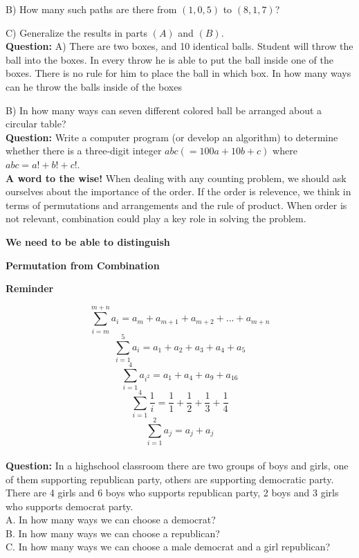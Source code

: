 \documentclass[11pt]{article}
\begin{document}
B) How many such paths are there from $(1,0,5)$ to $(8,1,7)$?

C) Generalize the results in parts $(A)$ and $(B)$.
\\

\textbf{Question:} A) There are two boxes, and 10 identical balls. Student will throw the 
ball into the boxes. In every throw he is able to put the ball inside one of the boxes. There 
is no rule for him to place the ball in which box. In how many ways can he throw the balls 
inside of the boxes %

B) In how many ways can seven different colored ball be arranged about a circular table? 
\\ %

\textbf{Question:}  Write a computer program (or develop an algorithm) to determine whether there is a three-digit integer $abc (= 100a + 10b + c)$ where $abc = a! + b! + c!$.
\\ %

\textbf{A word to the wise!} When dealing with any counting problem, we should ask 
ourselves about the importance of the order. If the order is relevence, we think in terms of 
permutations and arrangements and the rule of product. When order is not relevant, 
combination could play a key role in solving the problem.
\\

\begin{center}
\textbf{We need to be able to distinguish}

\textbf{Permutation from Combination}
\end{center}


\begin{center}
\textbf{Reminder}
\end{center}

$$\sum\limits_{i = m}^{m+n}{a_i = a_m+a_{m+1}+a_{m+2}+...+a_{m+n}}$$
$$\sum\limits_{i = 1}^5{a_i = a_1+a_2+a_3+a_4+a_5}$$
$$\sum\limits_{i = 1}^4{a_{i^2} = a_1+a_4+a_9+a_{16}}$$
$$\sum\limits_{i = 1}^4{\frac{1}{i} =\frac{1}{1}+\frac{1}{2}+\frac{1}{3}+\frac{1}{4}}$$
$$\sum\limits_{i = 1}^2{a_j = a_j+a_j}$$
\\

\textbf{Question:} In a highschool classroom there are two groups of boys and girls, one of 
them supporting republican party, others are supporting democratic party. There are 4 girls 
and 6 boys who supports republican party, 2 boys and 3 girls who supports democrat 
party.\\ %
A. In how many ways we can choose a democrat?\\
B. In how many ways we can choose a republican?\\
C. In how many ways we can choose a male democrat and a girl republican?\\
\\
\end{document}
